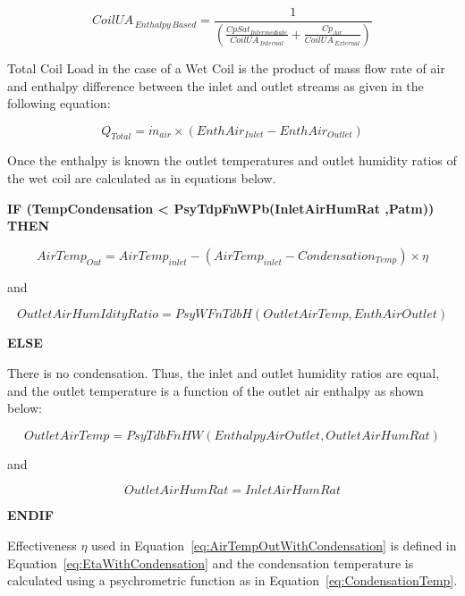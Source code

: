 \begin{equation}
CoilU{A_{\,Enthalpy\,Based}} = \frac{1}{{\left( {\frac{{CpSa{t_{Intermediate}}}}{{CoilU{A_{\,Internal}}}} + \frac{{C{p_{Air}}}}{{CoilU{A_{\,External}}}}} \right)}}
\label{eq:CoilUAEnthalpyBased}
\end{equation}

Total Coil Load in the case of a Wet Coil is the product of mass flow rate of air and enthalpy difference between the inlet and outlet streams as given in the following equation:

\begin{equation}
{Q_{Total}} = {\dot{m}_{air}} \times (EnthAi{r_{Inlet}} - EnthAi{r_{Outlet}})
\end{equation}

Once the enthalpy is known the outlet temperatures and outlet humidity ratios of the wet coil are calculated as in equations below.

\textbf{IF (TempCondensation \textless{} PsyTdpFnWPb(InletAirHumRat ,Patm)) THEN}

\begin{equation}
AirTem{p_{Out}} = AirTem{p_{inlet}} - (AirTem{p_{inlet}} - Condensatio{n_{Temp}}) \times \eta
\label{eq:AirTempOutWithCondensation}
\end{equation}

and

\begin{equation}
OutletAirHumIdityRatio = PsyWFnTdbH(OutletAirTemp,EnthAirOutlet)
\end{equation}

\textbf{ELSE}

There is no condensation.  Thus, the inlet and outlet humidity ratios are equal, and the outlet temperature is a function of the outlet air enthalpy as shown below:

\begin{equation}
OutletAirTemp = PsyTdbFnHW(EnthalpyAirOutlet, OutletAirHumRat)
\end{equation}

and

\begin{equation}
OutletAirHumRat = InletAirHumRat
\end{equation}

\textbf{ENDIF}

Effectiveness \(\eta\) used in Equation~\ref{eq:AirTempOutWithCondensation} is defined in Equation~\ref{eq:EtaWithCondensation} and the condensation temperature is calculated using a psychrometric function as in Equation~\ref{eq:CondensationTemp}.

